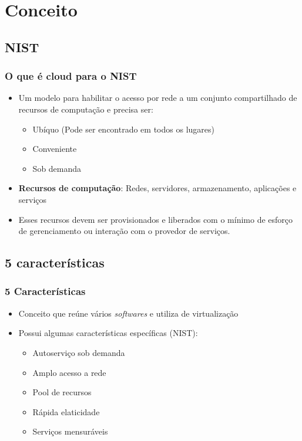 \section{Conceito}

\subsection{NIST}

\begin{frame}
	\frametitle{O que é cloud para o NIST}
	\begin{itemize}
		\item Um modelo para habilitar o acesso por rede a um conjunto compartilhado de recursos de computação e precisa ser:
			\begin{itemize}
				\item Ubíquo (Pode ser encontrado em todos os lugares)
				\item Conveniente
				\item Sob demanda
			\end{itemize}
		\item \textbf{Recursos de computação}: Redes, servidores, armazenamento, aplicações e serviços
		\item Esses recursos devem ser provisionados e liberados com o mínimo de esforço de gerenciamento ou interação com o provedor de serviços.
	\end{itemize}
\end{frame}

\subsection{5 características}

\begin{frame}
	\frametitle{5 Características}
	\begin{itemize}
		\item Conceito que reúne vários \textit{softwares} e utiliza de virtualização
		\item Possui algumas características específicas (NIST):
			\begin{itemize}
				\item Autoserviço sob demanda
				\item Amplo acesso a rede
				\item Pool de recursos
				\item Rápida elaticidade
				\item Serviços mensuráveis
			\end{itemize}
	\end{itemize}
\end{frame}

